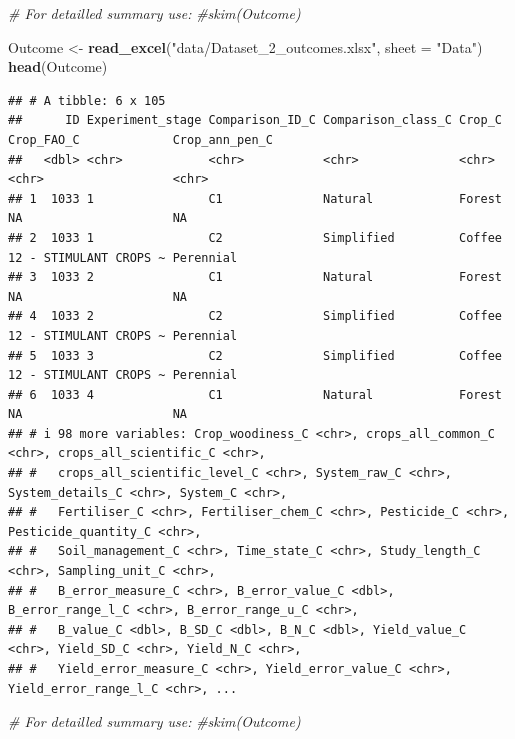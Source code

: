 \documentclass[
]{book}
\newenvironment{Shaded}{\begin{snugshade}}{\end{snugshade}}
\newcommand{\AttributeTok}[1]{\textcolor[rgb]{0.13,0.29,0.53}{#1}}
\newcommand{\CommentTok}[1]{\textcolor[rgb]{0.56,0.35,0.01}{\textit{#1}}}
\newcommand{\FunctionTok}[1]{\textcolor[rgb]{0.13,0.29,0.53}{\textbf{#1}}}
\newcommand{\NormalTok}[1]{#1}
\newcommand{\OtherTok}[1]{\textcolor[rgb]{0.56,0.35,0.01}{#1}}
\newcommand{\StringTok}[1]{\textcolor[rgb]{0.31,0.60,0.02}{#1}}
\begin{document}
\begin{Shaded}
\begin{Highlighting}[]
\CommentTok{\# For detailled summary use:}
\CommentTok{\#skim(Outcome)}

\NormalTok{Outcome }\OtherTok{\textless{}{-}} \FunctionTok{read\_excel}\NormalTok{(}\StringTok{"data/Dataset\_2\_outcomes.xlsx"}\NormalTok{, }\AttributeTok{sheet =} \StringTok{"Data"}\NormalTok{)}
\FunctionTok{head}\NormalTok{(Outcome)}
\end{Highlighting}
\end{Shaded}

\begin{verbatim}
## # A tibble: 6 x 105
##      ID Experiment_stage Comparison_ID_C Comparison_class_C Crop_C Crop_FAO_C             Crop_ann_pen_C
##   <dbl> <chr>            <chr>           <chr>              <chr>  <chr>                  <chr>         
## 1  1033 1                C1              Natural            Forest NA                     NA            
## 2  1033 1                C2              Simplified         Coffee 12 - STIMULANT CROPS ~ Perennial     
## 3  1033 2                C1              Natural            Forest NA                     NA            
## 4  1033 2                C2              Simplified         Coffee 12 - STIMULANT CROPS ~ Perennial     
## 5  1033 3                C2              Simplified         Coffee 12 - STIMULANT CROPS ~ Perennial     
## 6  1033 4                C1              Natural            Forest NA                     NA            
## # i 98 more variables: Crop_woodiness_C <chr>, crops_all_common_C <chr>, crops_all_scientific_C <chr>,
## #   crops_all_scientific_level_C <chr>, System_raw_C <chr>, System_details_C <chr>, System_C <chr>,
## #   Fertiliser_C <chr>, Fertiliser_chem_C <chr>, Pesticide_C <chr>, Pesticide_quantity_C <chr>,
## #   Soil_management_C <chr>, Time_state_C <chr>, Study_length_C <chr>, Sampling_unit_C <chr>,
## #   B_error_measure_C <chr>, B_error_value_C <dbl>, B_error_range_l_C <chr>, B_error_range_u_C <chr>,
## #   B_value_C <dbl>, B_SD_C <dbl>, B_N_C <dbl>, Yield_value_C <chr>, Yield_SD_C <chr>, Yield_N_C <chr>,
## #   Yield_error_measure_C <chr>, Yield_error_value_C <chr>, Yield_error_range_l_C <chr>, ...
\end{verbatim}

\begin{Shaded}
\begin{Highlighting}[]
\CommentTok{\# For detailled summary use:}
\CommentTok{\#skim(Outcome)}
\end{Highlighting}
\end{Shaded}
\end{document}
